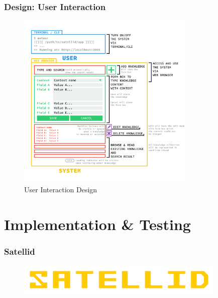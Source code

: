 \documentclass[10pt, compress]{beamer}
\begin{document}

\begin{frame}[fragile]
  \frametitle{Design: User Interaction}

  \begin{figure}[ht]
    \centering
    \vspace{-25pt}
    \includegraphics[height=8.5cm]{include/satellid-app-uix.png}
    \vspace{-10pt}
    \caption{User Interaction Design}
    \label{fig:satellid-app-uix}
  \end{figure}

\end{frame}


\section{Implementation \& Testing}


\begin{frame}[fragile]
  \frametitle{Satellid}

  \begin{figure}[ht]
    \centering
    \includegraphics[width=10cm]{include/satellid-logo.png}
    \label{fig:satellid-logo}
  \end{figure}

\end{frame}
\end{document}
